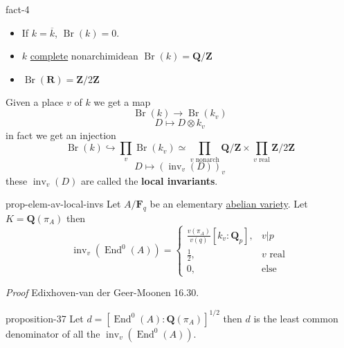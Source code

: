 \documentclass[10pt,]{book}
\makeatletter
\newcommand{\terminology}[1]{\textbf{#1}}
\renewcommand*{\proofname}{Proof}
\renewenvironment{proof}[1][\proofname]{\par
  \pushQED{\qed}%
  \normalfont \topsep6\p@\@plus6\p@\relax
  \trivlist
  \item\relax
    {\itshape
    #1\@addpunct{.}}\hspace\labelsep\ignorespaces
}{%
  \popQED\endtrivlist\@endpefalse
}
\numberwithin{equation}{section}
\newcommand{\lb}{[}
\newcommand{\rb}{]}
\newcommand{\ZZ}{\mathbf{Z}}
\newcommand{\QQ}{\mathbf{Q}}
\newcommand{\RR}{\mathbf{R}}
\newcommand{\FF}{\mathbf{F}}
\DeclareMathOperator{\End}{End}
\newcommand{\amp}{&}
\makeatother
\begin{document}
\begin{fact}{}{}{fact-4}%
\hypertarget{p-424}{}%
\leavevmode%
\begin{itemize}[label=\textbullet]
\item{}If \(k = \overline k\), \(\operatorname{Br}(k) = 0\).%
\item{}\(k\) \hyperref[def-abelian-complete-var]{complete} nonarchimidean \(\operatorname{Br}(k) = \QQ/\ZZ\)%
\item{}\(\operatorname{Br}(\RR) = \ZZ/2\ZZ\)%
\end{itemize}
Given a place \(v\) of \(k\) we get a map%
\begin{equation*}
\operatorname{Br}(k) \to \operatorname{Br}(k_v)
\end{equation*}
%
\begin{equation*}
D \mapsto D\otimes k_v
\end{equation*}
in fact we get an injection%
\begin{equation*}
\operatorname{Br}(k) \hookrightarrow \prod_v \operatorname{Br}(k_v) \simeq \prod_{v\text{ nonarch}} \QQ/\ZZ \times \prod_{v\text{ real}} \ZZ/2\ZZ
\end{equation*}
%
\begin{equation*}
D\mapsto (\operatorname{inv}_v(D))_v
\end{equation*}
these \(\operatorname{inv}_v(D)\) are called the \terminology{local invariants}.%
\end{fact}
\begin{proposition}{}{}{prop-elem-av-local-invs}%
\hypertarget{p-425}{}%
Let \(A/\FF_q\) be an elementary \hyperref[def-buntes-abvar]{abelian variety}. Let \(K = \QQ(\pi_A)\) then%
\begin{equation*}
\operatorname{inv}_v(\End^0(A)) = \begin{cases} \frac{v(\pi_A)}{v(q)} [k_v: \QQ_p], \amp v|p\\ \frac 12,\amp v\text{ real}\\ 0, \amp \text{else}\end{cases}
\end{equation*}
%
\end{proposition}
\begin{proof}\hypertarget{proof-72}{}
\hypertarget{p-426}{}%
Edixhoven-van der Geer-Moonen 16.30.%
\end{proof}
\begin{proposition}{}{}{proposition-37}%
\hypertarget{p-427}{}%
Let \(d= \lb \End^0(A) : \QQ(\pi_A) \rb^{1/2}\) then \(d\) is the least common denominator of all the \(\operatorname{inv}_v(\End^0(A))\).%
\end{proposition}
\end{document}
